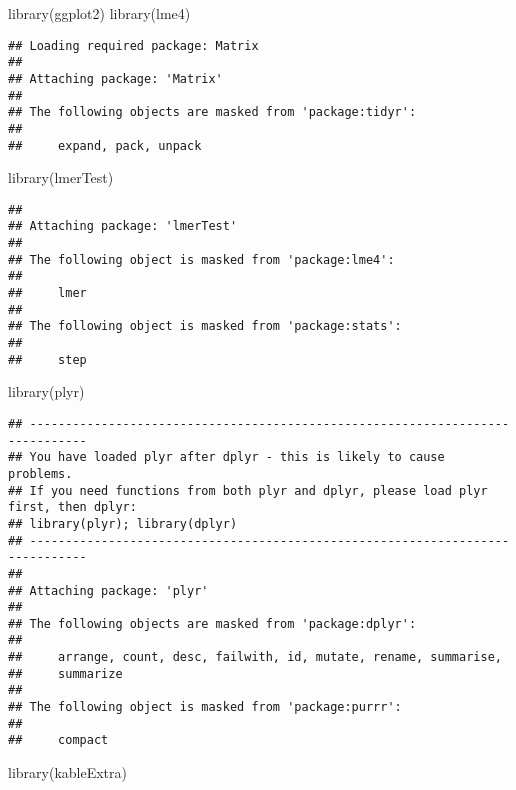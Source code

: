 \documentclass[
]{article}
\newenvironment{Shaded}{\begin{snugshade}}{\end{snugshade}}
\newcommand{\FunctionTok}[1]{\textcolor[rgb]{0.00,0.00,0.00}{#1}}
\newcommand{\NormalTok}[1]{#1}
\begin{document}
\begin{Shaded}
\begin{Highlighting}[]
\FunctionTok{library}\NormalTok{(ggplot2)}
\FunctionTok{library}\NormalTok{(lme4)          }
\end{Highlighting}
\end{Shaded}

\begin{verbatim}
## Loading required package: Matrix
## 
## Attaching package: 'Matrix'
## 
## The following objects are masked from 'package:tidyr':
## 
##     expand, pack, unpack
\end{verbatim}

\begin{Shaded}
\begin{Highlighting}[]
\FunctionTok{library}\NormalTok{(lmerTest) }
\end{Highlighting}
\end{Shaded}

\begin{verbatim}
## 
## Attaching package: 'lmerTest'
## 
## The following object is masked from 'package:lme4':
## 
##     lmer
## 
## The following object is masked from 'package:stats':
## 
##     step
\end{verbatim}

\begin{Shaded}
\begin{Highlighting}[]
\FunctionTok{library}\NormalTok{(plyr) }
\end{Highlighting}
\end{Shaded}

\begin{verbatim}
## ------------------------------------------------------------------------------
## You have loaded plyr after dplyr - this is likely to cause problems.
## If you need functions from both plyr and dplyr, please load plyr first, then dplyr:
## library(plyr); library(dplyr)
## ------------------------------------------------------------------------------
## 
## Attaching package: 'plyr'
## 
## The following objects are masked from 'package:dplyr':
## 
##     arrange, count, desc, failwith, id, mutate, rename, summarise,
##     summarize
## 
## The following object is masked from 'package:purrr':
## 
##     compact
\end{verbatim}

\begin{Shaded}
\begin{Highlighting}[]
\FunctionTok{library}\NormalTok{(kableExtra)}
\end{Highlighting}
\end{Shaded}
\end{document}
